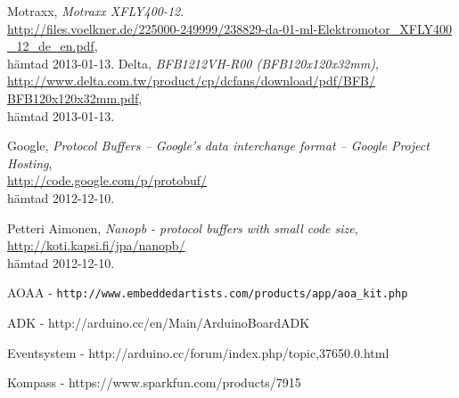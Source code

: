 \begin{thebibliography}{9}
Motraxx,
\emph{Motraxx XFLY400-12}. \\
\url{http://files.voelkner.de/225000-249999/238829-da-01-ml-Elektromotor_XFLY400
_12_de_en.pdf},
\\ hämtad 2013-01-13.
Delta,
\emph{BFB1212VH-R00 (BFB120x120x32mm)},\\
\url{http://www.delta.com.tw/product/cp/dcfans/download/pdf/BFB/
BFB120x120x32mm.pdf},
\\ hämtad 2013-01-13.

Google,
\emph{Protocol Buffers – Google's data interchange format – Google Project
Hosting}, \\
\url{http://code.google.com/p/protobuf/} \\
hämtad 2012-12-10.

Petteri Aimonen,
\emph{Nanopb - protocol buffers with small code size}, \\
\url{http://koti.kapsi.fi/jpa/nanopb/} \\
hämtad 2012-12-10.
\end{thebibliography}

AOAA - \verb|http://www.embeddedartists.com/products/app/aoa_kit.php|

ADK - http://arduino.cc/en/Main/ArduinoBoardADK

Eventsystem - http://arduino.cc/forum/index.php/topic,37650.0.html

Kompass - https://www.sparkfun.com/products/7915 